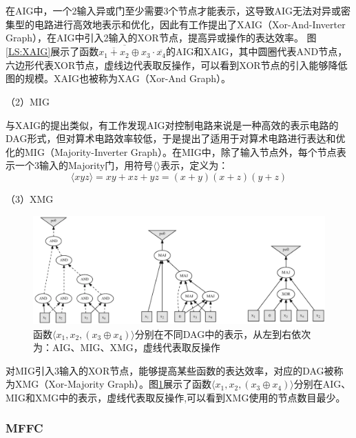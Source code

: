 在AIG中，一个2输入异或门至少需要3个节点才能表示，这导致AIG无法对异或密集型的电路进行高效地表示和优化，因此有工作提出了XAIG（Xor-And-Inverter Graph），在AIG中引入2输入的XOR节点，提高异或操作的表达效率\cite{LS:XAIG_Microelec_Relia,LS:XAIG_ddecs,LS:XAIG_iwls}。
图\ref{LS:XAIG}展示了函数$ \overline{ \overline{x_1 + x_2} \oplus x_3} \cdot \overline{x_4} $的AIG和XAIG，其中圆圈代表AND节点，六边形代表XOR节点，虚线边代表取反操作，可以看到XOR节点的引入能够降低图的规模。XAIG也被称为XAG（Xor-And Graph）。

（2）MIG

与XAIG的提出类似，有工作发现AIG对控制电路来说是一种高效的表示电路的DAG形式，但对算术电路效率较低，于是提出了适用于对算术电路进行表达和优化的MIG（Majority-Inverter Graph）\cite{LS:MIG}。在MIG中，除了输入节点外，每个节点表示一个3输入的Majority门，用符号$\langle \rangle$表示，定义为：
\begin{equation}
    \label{LS:MIG:Eq:Majority}
    \langle xyz \rangle = xy + xz + yz = (x + y) (x + z) (y + z)
\end{equation}

（3）XMG

\begin{figure}[!htbp]
    \centering
    \includegraphics[width=\linewidth]{./figs/LS-XMG.png}
    \caption{函数$\langle x_1,x_2,(x_3 \oplus x_4) \rangle$分别在不同DAG中的表示，从左到右依次为：AIG、MIG、XMG，虚线代表取反操作}
    \label{LS:XMG}
\end{figure}

对MIG引入3输入的XOR节点，能够提高某些函数的表达效率，对应的DAG被称为XMG（Xor-Majority Graph）\cite{LS:XMG_2017}。图\ref{LS:XMG}展示了函数$\langle x_1,x_2,(x_3 \oplus x_4) \rangle$分别在AIG、MIG和XMG中的表示，虚线代表取反操作,可以看到XMG使用的节点数目最少\cite{LS:XMG_2024}。

\subsubsection{MFFC} \label{MFFC}

